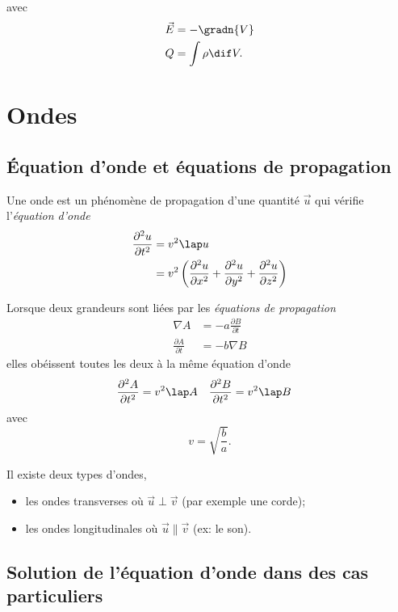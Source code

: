 avec
\begin{align*}
  \vec{E} & = -\gradn{V}\\
  Q & = \int \rho \dif V.
\end{align*}

\section{Ondes}
\subsection{Équation d'onde et équations de propagation}
Une onde est un phénomène de propagation d'une quantité \(\vec{u}\)
 qui vérifie l'\emph{équation d'onde}
\begin{equation*}\begin{split}
\frac{\partial^2 u}{\partial t^2} &= v^2 \lap u \\
 &= v^2 \left(
 \frac{\partial^2 u}{\partial x^2} +
 \frac{\partial^2 u}{\partial y^2} +
 \frac{\partial^2 u}{\partial z^2}\right)
\end{split}\end{equation*}

Lorsque deux grandeurs sont liées par les \emph{équations de propagation}
\begin{equation}\begin{split}\label{eq:propagation}
    \nabla A & = -a \frac{\partial B}{\partial t} \\
    \frac{\partial A}{\partial t} & = -b \nabla B
\end{split}\end{equation}
elles obéissent toutes les deux à la même équation d'onde
\begin{align*}
\dfrac{\partial^2 A}{\partial t^2} &= v^2 \lap A
& \dfrac{\partial^2 B}{\partial t^2} &= v^2 \lap B
\end{align*}
avec \[v = \sqrt{\frac{b}{a}}.\]

Il existe deux types d'ondes,
\begin{itemize}
  \item les ondes transverses où $\vec{u} \perp \vec{v}$ (par exemple une corde);
  \item les ondes longitudinales où $\vec{u} \parallel \vec{v}$ (ex: le son).
\end{itemize}

\subsection[Cas particuliers]{Solution de l'équation d'onde dans des cas particuliers}
